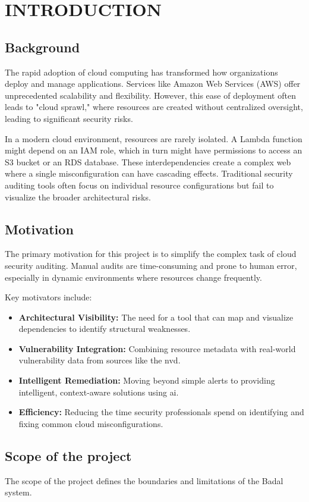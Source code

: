 \chapter{\MakeUppercase{Introduction}}
\justifying
\section{Background}
The rapid adoption of cloud computing has transformed how organizations deploy and manage applications. Services like Amazon Web Services (AWS) offer unprecedented scalability and flexibility. However, this ease of deployment often leads to "cloud sprawl," where resources are created without centralized oversight, leading to significant security risks.

In a modern cloud environment, resources are rarely isolated. A Lambda function might depend on an IAM role, which in turn might have permissions to access an S3 bucket or an RDS database. These interdependencies create a complex web where a single misconfiguration can have cascading effects. Traditional security auditing tools often focus on individual resource configurations but fail to visualize the broader architectural risks.

\section{Motivation}
The primary motivation for this project is to simplify the complex task of cloud security auditing. Manual audits are time-consuming and prone to human error, especially in dynamic environments where resources change frequently. 

Key motivators include:
\begin{itemize}
	\item \textbf{Architectural Visibility:} The need for a tool that can map and visualize dependencies to identify structural weaknesses.
	\item \textbf{Vulnerability Integration:} Combining resource metadata with real-world vulnerability data from sources like the \ac{nvd}.
	\item \textbf{Intelligent Remediation:} Moving beyond simple alerts to providing intelligent, context-aware solutions using \ac{ai}.
	\item \textbf{Efficiency:} Reducing the time security professionals spend on identifying and fixing common cloud misconfigurations.
\end{itemize}

\section{Scope of the project}
The scope of the project defines the boundaries and limitations of the Badal system.

